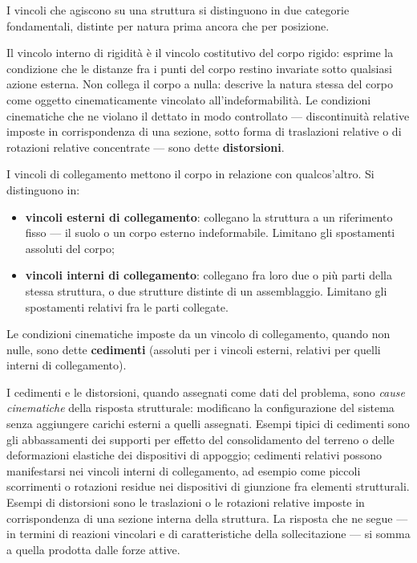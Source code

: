 I vincoli che agiscono su una struttura si distinguono in due categorie fondamentali, distinte per natura prima ancora che per posizione.

Il vincolo interno di rigidità è il vincolo costitutivo del corpo rigido: esprime la condizione che le distanze fra i punti del corpo restino invariate sotto qualsiasi azione esterna. Non collega il corpo a nulla: descrive la natura stessa del corpo come oggetto cinematicamente vincolato all'indeformabilità. Le condizioni cinematiche che ne violano il dettato in modo controllato --- discontinuità relative imposte in corrispondenza di una sezione, sotto forma di traslazioni relative o di rotazioni relative concentrate --- sono dette \textbf{distorsioni}.

I vincoli di collegamento mettono il corpo in relazione con qualcos'altro. Si distinguono in:

\begin{itemize}[nosep]
	\item \textbf{vincoli esterni di collegamento}: collegano la struttura a un riferimento fisso --- il suolo o un corpo esterno indeformabile. Limitano gli spostamenti assoluti del corpo;
	\item \textbf{vincoli interni di collegamento}: collegano fra loro due o più parti della stessa struttura, o due strutture distinte di un assemblaggio. Limitano gli spostamenti relativi fra le parti collegate.
\end{itemize}

Le condizioni cinematiche imposte da un vincolo di collegamento, quando non nulle, sono dette \textbf{cedimenti} (assoluti per i vincoli esterni, relativi per quelli interni di collegamento).

I cedimenti e le distorsioni, quando assegnati come dati del problema, sono \textit{cause cinematiche} della risposta strutturale: modificano la configurazione del sistema senza aggiungere carichi esterni a quelli assegnati. Esempi tipici di cedimenti sono gli abbassamenti dei supporti per effetto del consolidamento del terreno o delle deformazioni elastiche dei dispositivi di appoggio; cedimenti relativi possono manifestarsi nei vincoli interni di collegamento, ad esempio come piccoli scorrimenti o rotazioni residue nei dispositivi di giunzione fra elementi strutturali. Esempi di distorsioni sono le traslazioni o le rotazioni relative imposte in corrispondenza di una sezione interna della struttura. La risposta che ne segue --- in termini di reazioni vincolari e di caratteristiche della sollecitazione --- si somma a quella prodotta dalle forze attive.

